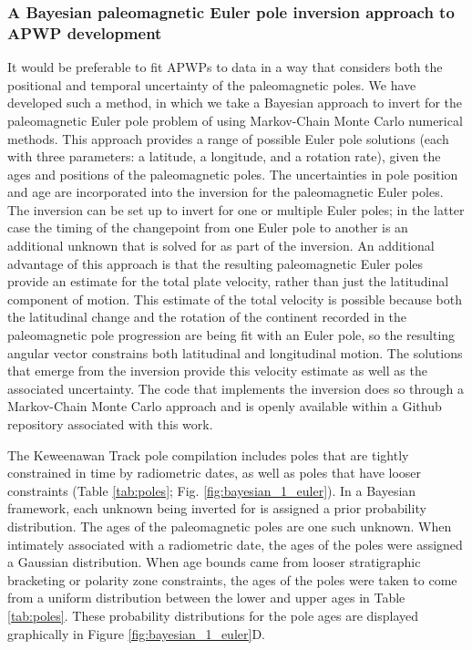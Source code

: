 \documentclass[11pt,letterpaper]{article}
\begin{document}
\subsubsection{A Bayesian paleomagnetic Euler pole inversion approach to APWP development}

It would be preferable to fit APWPs to data in a way that considers both the positional and temporal uncertainty of the paleomagnetic poles. We have developed such a method, in which we take a Bayesian approach to invert for the paleomagnetic Euler pole problem of \citet{Gordon1984a} using Markov-Chain Monte Carlo numerical methods. This approach provides a range of possible Euler pole solutions (each with three parameters: a latitude, a longitude, and a rotation rate), given the ages and positions of the paleomagnetic poles. The uncertainties in pole position and age are incorporated into the inversion for the paleomagnetic Euler poles. The inversion can be set up to invert for one or multiple Euler poles; in the latter case the timing of the changepoint from one Euler pole to another is an additional unknown that is solved for as part of the inversion.  An additional advantage of this approach is that the resulting paleomagnetic Euler poles provide an estimate for the total plate velocity, rather than just the latitudinal component of motion. This estimate of the total velocity is possible because both the latitudinal change and the rotation of the continent recorded in the paleomagnetic pole progression are being fit with an Euler pole, so the resulting angular vector constrains both latitudinal and longitudinal motion. The solutions that emerge from the inversion provide this velocity estimate as well as the associated uncertainty. The code that implements the inversion does so through a Markov-Chain Monte Carlo approach and is openly available within a Github repository associated with this work.

The Keweenawan Track pole compilation includes poles that are tightly constrained in time by radiometric dates, as well as poles that have looser constraints (Table \ref{tab:poles}; Fig. \ref{fig:bayesian_1_euler}). In a Bayesian framework, each unknown being inverted for is assigned a prior probability distribution. The ages of the paleomagnetic poles are one such unknown. When intimately associated with a radiometric date, the ages of the poles were assigned a Gaussian distribution. When age bounds came from looser stratigraphic bracketing or polarity zone constraints, the ages of the poles were taken to come from a uniform distribution between the lower and upper ages in Table \ref{tab:poles}. These probability distributions for the pole ages are displayed graphically in Figure \ref{fig:bayesian_1_euler}D.
\end{document}

